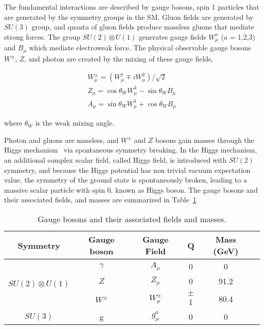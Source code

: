 The fundamental interactions are described by gauge bosons, spin 1 particles that are generated by the symmetry groups in the SM. Gluon fields are generated by $SU(3)$ group, and quanta of gluon fields produce massless gluons that mediate strong forces. The group $SU(2) \otimes U(1)$ generates gauge fields $W^{a}_{\mu}$ ($a$ = 1,2,3) and $B_{\mu}$ which mediate electroweak force. The physical observable gauge bosons $W^{\pm}$, $Z$, and photon are created by the mixing of these gauge fields, 

\begin{equation}
\label{eq:electroweak_mixing}
\begin{split}
	W^{\pm}_{\mu} = (W^{1}_{\mu} \mp iW^{2}_{\mu}) / \sqrt{2} \\
	Z_{\mu} = \cos \theta_{W} W^{3}_{\mu} - \sin\theta_{W} B_{\mu} \\
	A_{\mu} = \sin \theta_{W} W^{3}_{\mu} + \cos\theta_{W} B_{\mu}
\end{split}
\end{equation}

where $\theta_{W}$ is the weak mixing angle.

Photon and gluons are massless, and $W^{\pm}$ and $Z$ bosons gain masses through the Higgs mechanism~\cite{PhysRevLett.13.508} via spontaneous symmetry breaking. In the Higgs mechanism, an additional complex scalar field, called Higgs field, is introduced with $SU(2)$ symmetry, and because the Higgs potential has non trivial vacuum expectation value, the symmetry of the ground state is spontaneously broken, leading to a massive scalar particle with spin 0, known as Higgs boson. The gauge bosons and their associated fields, and masses are summarized in Table~\ref{table:gauge_bosons}

\begin{table}[!htb]
  \centering
  \begin{tabular}{c c c c c c}
    \hline
    \hline
	Symmetry	& Gauge boson	& Gauge Field	& Q & Mass (GeV) \\
	\hline
	\multirow{3}{*}{$SU(2) \otimes U(1)$} & $\gamma$  &	$A_{\mu}$       & 0	   	& 0 	\\
										  & $Z$		  &	$Z_{\mu}$       & 0	   	& 91.2 	\\
										  & $W^{\pm}$ &	$W_{\mu}^{\pm}$ & $\pm$1  & 80.4 	\\
	\hline
	$SU(3)$								  & g		  &	$g^{a}_{\mu}$   &  0		& 0		\\

    \hline
    \hline
  \end{tabular}
  \caption{Gauge bosons and their associated fields and masses.}
  \label{table:gauge_bosons}
\end{table}


